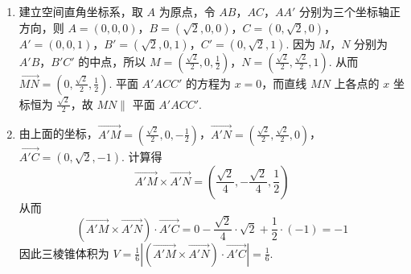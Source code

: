 \begin{solution}
\begin{enumerate}
\item 建立空间直角坐标系，取 \(A\) 为原点，令 \(AB\)，\(AC\)，\(AA'\) 分别为三个坐标轴正方向，则
\(A=(0,0,0)\)，\(B=(\sqrt{2},0,0)\)，\(C=(0,\sqrt{2},0)\)，\(A'=(0,0,1)\)，\(B'=(\sqrt{2},0,1)\)，\(C'=(0,\sqrt{2},1)\). 因为 \(M\)，\(N\) 分别为 \(A'B\)，\(B'C'\) 的中点，所以
\(M=\left(\frac{\sqrt{2}}{2},0,\frac{1}{2}\right)\)，\(N=\left(\frac{\sqrt{2}}{2},\frac{\sqrt{2}}{2},1\right)\). 从而 \(\overrightarrow{MN}=\left(0,\frac{\sqrt{2}}{2},\frac{1}{2}\right)\). 平面 \(A'ACC'\) 的方程为 \(x=0\)，而直线 \(MN\) 上各点的 \(x\) 坐标恒为 \(\frac{\sqrt{2}}{2}\)，故 \(MN\parallel\) 平面 \(A'ACC'\).
        \item 由上面的坐标，\(\overrightarrow{A'M}=\left(\frac{\sqrt{2}}{2},0,-\frac{1}{2}\right)\)，\(\overrightarrow{A'N}=\left(\frac{\sqrt{2}}{2},\frac{\sqrt{2}}{2},0\right)\)，\(\overrightarrow{A'C}=\left(0,\sqrt{2},-1\right)\). 计算得
\[
\overrightarrow{A'M}\times\overrightarrow{A'N}
=\left(\frac{\sqrt{2}}{4},-\frac{\sqrt{2}}{4},\frac{1}{2}\right)
\]
从而
\[
\left(\overrightarrow{A'M}\times\overrightarrow{A'N}\right)\cdot\overrightarrow{A'C}
=0-\frac{\sqrt{2}}{4}\cdot\sqrt{2}+\frac{1}{2}\cdot(-1)=-1
\]
因此三棱锥体积为
\(\displaystyle V=\frac{1}{6}\left|\left(\overrightarrow{A'M}\times\overrightarrow{A'N}\right)\cdot\overrightarrow{A'C}\right|=\frac{1}{6}\).
\end{enumerate}
\end{solution}

